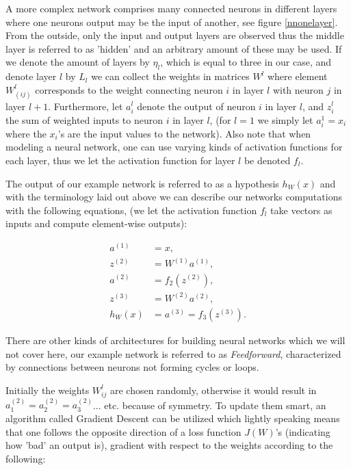 \documentclass[journal,twoside]{IEEEtran}
\begin{document}
A more complex network comprises many connected neurons in different layers where one neurons output may be the input of another, see figure \ref{nnonelayer}. From the outside, only the input and output layers are observed thus the middle layer is referred to as 'hidden' and an arbitrary amount of these may be used. If we denote the amount of layers by $\eta_l$, which is equal to three in our case, and denote layer $l$ by $L_l$ we can collect the weights in matrices $W^{l}$ where element $W_{(ij)}^{l}$ corresponds to the weight connecting neuron $i$ in layer $l$ with neuron $j$ in layer $l+1$. Furthermore, let $a_{i}^{l}$ denote the output of neuron $i$ in layer $l$, and $z_{i}^{l}$ the sum of weighted inputs to neuron $i$ in layer $l$, (for $l=1$ we simply let $a_{i}^{1} = x_i$ where the $x_i$'s are the input values to the network). Also note that when modeling a neural network, one can use varying kinds of activation functions for each layer, thus we let the activation function for layer $l$ be denoted $f_l$.

The output of our example network is referred to as a hypothesis $h_W(x)$ and with the terminology laid out above we can describe our networks computations with the following equations, (we let the activation function $f_l$ take vectors as inputs and compute element-wise outputs):

\begin{subequations}
\begin{align}
a^{(1)}&=x,\\
z^{(2)}&=W^{(1)}a^{(1)},\\
a^{(2)}&=f_2(z^{(2)}),\\
z^{(3)}&=W^{(2)}a^{(2)},\\
h_W(x)&=a^{(3)}=f_3(z^{(3)}).
\end{align}
\end{subequations}

There are other kinds of architectures for building neural networks which we will not cover here, our example network is referred to as \textit{Feedforward}, characterized by connections between neurons not forming cycles or loops.

Initially the weights $W^{l}_{ij}$ are chosen randomly, otherwise it would result in $a^{(2)}_1=a^{(2)}_2=a^{(2)}_3$... etc. because of symmetry. To update them smart, an algorithm called Gradient Descent can be utilized which lightly speaking means that one follows the opposite direction of a loss function $J(W)$'s (indicating how 'bad' an output is), gradient with respect to the weights according to the following:
\end{document}
